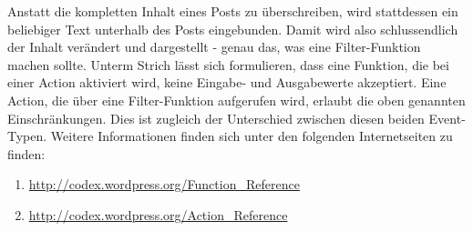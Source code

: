 Anstatt die kompletten Inhalt eines Posts zu überschreiben, wird stattdessen ein beliebiger Text unterhalb des Posts eingebunden. Damit wird also schlussendlich der Inhalt verändert und dargestellt - genau das, was eine Filter-Funktion machen sollte.\newline
Unterm Strich lässt sich formulieren, dass eine Funktion, die bei einer Action aktiviert wird, keine Eingabe- und Ausgabewerte akzeptiert. \newline
Eine Action, die über eine Filter-Funktion aufgerufen wird, erlaubt die oben genannten Einschränkungen. Dies ist zugleich der Unterschied zwischen diesen beiden Event-Typen.
Weitere Informationen finden sich unter den folgenden Internetseiten zu finden:
\begin{enumerate}
	\item \url{http://codex.wordpress.org/Function\_Reference}
	\item \url{http://codex.wordpress.org/Action\_Reference}
\end{enumerate}
